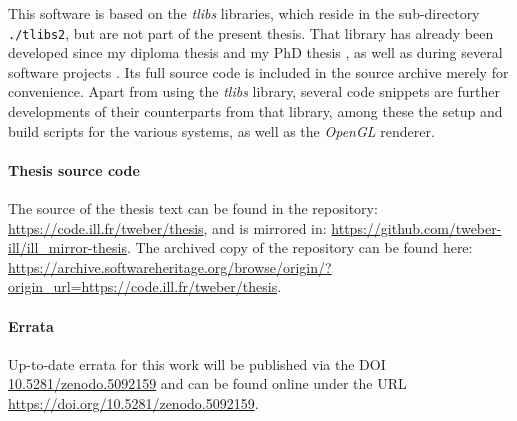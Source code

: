 This software is based on the \textit{tlibs} libraries, which reside in the 
sub-directory \lstinline|./tlibs2|, but are not part of the present thesis.
That library has already been developed since my diploma thesis \cite{DiplomaWeber} 
and my PhD thesis \cite{PhDWeber}, as well as during several software 
projects \cite{Weber2014, Takin2016, Takin2017, Takin2021}.
Its full source code is included in the source archive merely for convenience.
Apart from using the \textit{tlibs} library, several code snippets are further developments
of their counterparts from that library, among these the setup and build scripts for the various
systems, as well as the \textit{OpenGL} renderer.


\paragraph{Thesis source code}
The source of the thesis text can be found in the repository:
\url{https://code.ill.fr/tweber/thesis}, and is mirrored in:
\url{https://github.com/tweber-ill/ill_mirror-thesis}.
The archived copy of the repository can be found here:
\url{https://archive.softwareheritage.org/browse/origin/?origin_url=https://code.ill.fr/tweber/thesis}.


\paragraph{Errata}
Up-to-date errata for this work will be published via the DOI
\href{https://doi.org/10.5281/zenodo.5092159}{10.5281/zenodo.5092159}
and can be found online under the URL \url{https://doi.org/10.5281/zenodo.5092159}.
